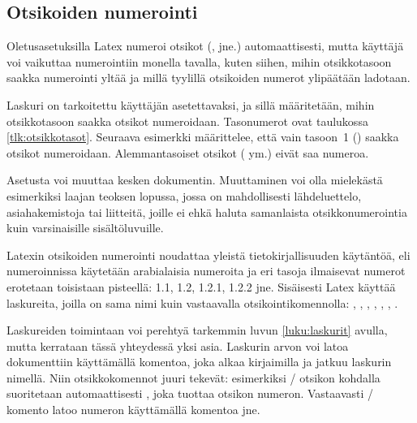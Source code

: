 \subsection{Otsikoiden numerointi}
\label{luku:otsikot_numerointi}

Oletusasetuksilla Latex numeroi otsikot (,
 jne.) automaattisesti, mutta käyttäjä voi vaikuttaa
numerointiin monella tavalla, kuten siihen, mihin otsikkotasoon saakka
numerointi yltää ja millä tyylillä otsikoiden numerot ylipäätään
ladotaan.

Laskuri  on tarkoitettu käyttäjän asetettavaksi,
ja sillä määritetään, mihin otsikkotasoon saakka otsikot numeroidaan.
Tasonumerot ovat taulukossa \ref{tlk:otsikkotasot}. Seuraava esimerkki
määrittelee, että vain tasoon~1 () saakka otsikot
numeroidaan. Alemmantasoiset otsikot ( ym.) eivät
saa numeroa.

\begin{koodilohkosis}
\setcounter{secnumdepth}{1}
\end{koodilohkosis}

Asetusta voi muuttaa kesken dokumentin. Muuttaminen voi olla mielekästä
esimerkiksi laajan teoksen lopussa, jossa on mahdollisesti
lähdeluettelo, asiahakemistoja tai liitteitä, joille ei ehkä haluta
samanlaista otsikkonumerointia kuin varsinaisille sisältöluvuille.

Latexin otsikoiden numerointi noudattaa yleistä tietokirjallisuuden
käytäntöä, eli numeroinnissa käytetään arabialaisia numeroita ja eri
tasoja ilmaisevat numerot erotetaan toisistaan pisteellä: 1.1, 1.2,
1.2.1, 1.2.2 jne. Sisäisesti Latex käyttää laskureita, joilla on sama
nimi kuin vastaavalla otsikointikomennolla: ,
, , ,
, , .

Laskureiden toimintaan voi perehtyä tarkemmin luvun \ref{luku:laskurit}
avulla, mutta kerrataan tässä yhteydessä yksi asia. Laskurin arvon voi
latoa dokumenttiin käyttämällä komentoa, joka alkaa kirjaimilla
 ja jatkuu laskurin nimellä. Niin otsikkokomennot juuri
tekevät: esimerkiksi \-/ otsikon kohdalla suoritetaan
automaattisesti , joka tuottaa otsikon numeron.
Vastaavasti \-/ komento latoo numeron käyttämällä
komentoa  jne.

